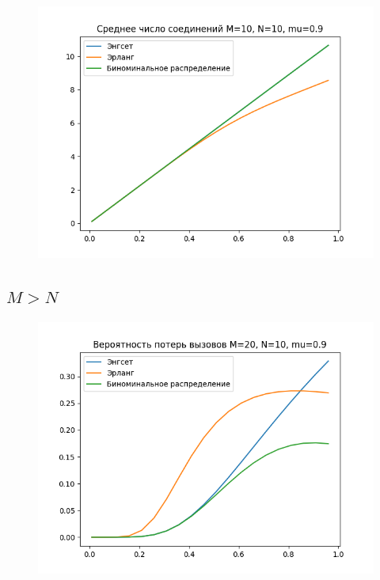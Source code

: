 \documentclass[12pt]{article}
\let\Oldsubsection\subsection
\renewcommand{\subsection}{\FloatBarrier\Oldsubsection}
\begin{document}
\begin{figure}[!htb]
\centering
\includegraphics[scale=1.00]{assets/iss_1/aver_conn_M10_N10_mu09.png}
\caption{}
\label{}
\end{figure}

\subsection{$M > N$}\label{subsec2:}
\begin{figure}[!htb]
\centering
\includegraphics[scale=1.00]{assets/iss_1/loss_prob_M20_N10_mu09.png}
\caption{}
\label{}
\end{figure}
\end{document}
